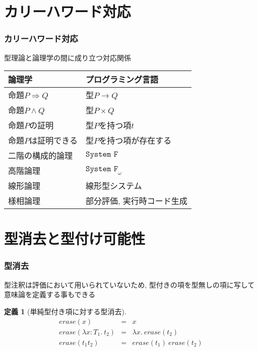 \documentclass[dvipdfmx,cjk,xcolor=dvipsnames,envcountsect,notheorems,aspectratio=169]{beamer}
\theoremstyle{definition}
\newtheorem{definition}{定義}
\begin{document}
\section{カリーハワード対応}

\begin{frame}
  \frametitle{カリーハワード対応}
	\Large 型理論と論理学の間に成り立つ対応関係
	\begin{table}[htb]
		\begin{tabular}{l l}
			論理学 & プログラミング言語 \\
			\hline
			命題$P\Rightarrow Q$ & 型$P\to Q$ \\
			命題$P \land Q$ & 型$P \times Q$ \\
			命題$P$の証明 & 型$P$を持つ項$t$ \\
			命題$P$は証明できる & 型$P$を持つ項が存在する\\
			二階の構成的論理 & $\texttt{System F}$ \\
			高階論理 & $\texttt{System F}_\omega$ \\
			線形論理 & 線形型システム \\
			様相論理 & 部分評価, 実行時コード生成
		\end{tabular}
	\end{table}
\end{frame}

\section{型消去と型付け可能性}

\begin{frame}
  \frametitle{型消去}
	\Large 型注釈は評価において用いられていないため, 型付きの項を型無しの項に写して意味論を定義する事もできる
  \renewcommand{\thedefinition}{9.5.1}
	\begin{definition}[単純型付き項に対する型消去]
		\[
			\begin{array}{lcl}
				\textit{erase}(x) & = & x \\
				\textit{erase}(\lambda x : T_1.~t_2) & = & \lambda x.~\textit{erase}(t_2) \\
				\textit{erase}(t_1 t_2) & = & \textit{erase}(t_1)~\textit{erase}(t_2)
			\end{array}
		\]
	\end{definition}
\end{frame}
\end{document}
